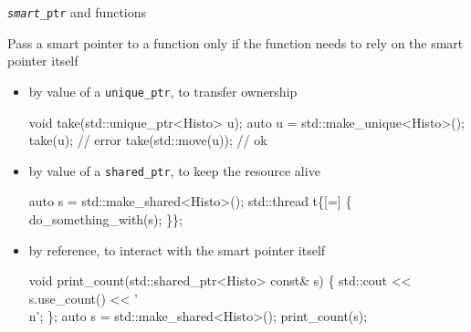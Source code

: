 \begin{frame}[fragile]{\texttt{\textit{smart}\_ptr} and functions}

  Pass a smart pointer to a function only if the function needs to rely on
  the smart pointer itself

  \begin{itemize}

  \item<2-> by value of a \texttt{unique\_ptr}, to transfer ownership
    \begin{codeblock}
void take(std::unique\_ptr<Histo> u);
auto u = std::make\_unique<Histo>();
take(u);            // error
take(std::move(u)); // ok\end{codeblock}

\item<3-> by value of a \texttt{shared\_ptr}, to keep the resource alive
  \begin{codeblock}
auto s = std::make\_shared<Histo>();
std::thread t\{[=] \{ do\_something\_with(s); \}\};\end{codeblock}

\item<4-> by reference, to interact with the smart pointer itself
  \begin{codeblock}
void print\_count(std::shared\_ptr<Histo> const& s) \{
  std::cout <{}< s.use\_count() <{}< '\\n';
\};
auto s = std::make\_shared<Histo>();
print\_count(s);\end{codeblock}

  \end{itemize}

\end{frame}

